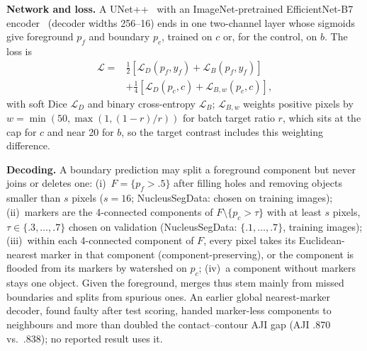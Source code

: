 \documentclass{article}
\begin{document}
\textbf{Network and loss.} A UNet++~\cite{zhou2018unetpp} with an ImageNet-pretrained EfficientNet-B7 encoder~\cite{tan2019efficientnet} (decoder widths 256--16) ends in one two-channel layer whose sigmoids give foreground $p_f$ and boundary $p_c$, trained on $c$ or, for the control, on $b$. The loss is
\begin{equation}
\begin{split}
\mathcal L={}&\tfrac12[\mathcal L_D(p_f,y_f)+\mathcal L_B(p_f,y_f)]\\
&+\tfrac14[\mathcal L_D(p_c,c)+\mathcal L_{B,w}(p_c,c)],
\end{split}
\end{equation}
with soft Dice $\mathcal L_D$ and binary cross-entropy $\mathcal L_B$; $\mathcal L_{B,w}$ weights positive pixels by $w=\min(50,\max(1,(1-r)/r))$ for batch target ratio $r$, which sits at the cap for $c$ and near 20 for $b$, so the target contrast includes this weighting difference.

\textbf{Decoding.} A boundary prediction may split a foreground component but never joins or deletes one: (i)~$F=\{p_f>.5\}$ after filling holes and removing objects smaller than $s$ pixels ($s=16$; NucleusSegData: chosen on training images); (ii)~markers are the 4-connected components of $F\setminus\{p_c>\tau\}$ with at least $s$ pixels, $\tau\in\{.3,\dots,.7\}$ chosen on validation (NucleusSegData: $\{.1,\dots,.7\}$, training images); (iii)~within each 4-connected component of $F$, every pixel takes its Euclidean-nearest marker in that component (component-preserving), or the component is flooded from its markers by watershed on $p_c$; (iv)~a component without markers stays one object. Given the foreground, merges thus stem mainly from missed boundaries and splits from spurious ones. An earlier global nearest-marker decoder, found faulty after test scoring, handed marker-less components to neighbours and more than doubled the contact--contour AJI gap (AJI .870 vs.\ .838); no reported result uses it.
\end{document}
